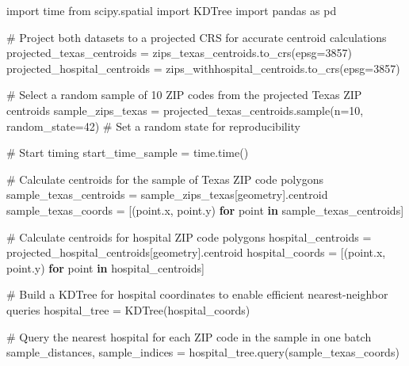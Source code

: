 \documentclass[
  letterpaper,
  DIV=11,
  numbers=noendperiod]{scrartcl}
\newenvironment{Shaded}{\begin{snugshade}}{\end{snugshade}}
\newcommand{\CommentTok}[1]{\textcolor[rgb]{0.37,0.37,0.37}{#1}}
\newcommand{\ControlFlowTok}[1]{\textcolor[rgb]{0.00,0.23,0.31}{\textbf{#1}}}
\newcommand{\DecValTok}[1]{\textcolor[rgb]{0.68,0.00,0.00}{#1}}
\newcommand{\ImportTok}[1]{\textcolor[rgb]{0.00,0.46,0.62}{#1}}
\newcommand{\KeywordTok}[1]{\textcolor[rgb]{0.00,0.23,0.31}{\textbf{#1}}}
\newcommand{\NormalTok}[1]{\textcolor[rgb]{0.00,0.23,0.31}{#1}}
\newcommand{\OperatorTok}[1]{\textcolor[rgb]{0.37,0.37,0.37}{#1}}
\newcommand{\StringTok}[1]{\textcolor[rgb]{0.13,0.47,0.30}{#1}}
\begin{document}
\begin{Shaded}
\begin{Highlighting}[]
\ImportTok{import}\NormalTok{ time}
\ImportTok{from}\NormalTok{ scipy.spatial }\ImportTok{import}\NormalTok{ KDTree}
\ImportTok{import}\NormalTok{ pandas }\ImportTok{as}\NormalTok{ pd}

\CommentTok{\# Project both datasets to a projected CRS for accurate centroid calculations}
\NormalTok{projected\_texas\_centroids }\OperatorTok{=}\NormalTok{ zips\_texas\_centroids.to\_crs(epsg}\OperatorTok{=}\DecValTok{3857}\NormalTok{)}
\NormalTok{projected\_hospital\_centroids }\OperatorTok{=}\NormalTok{ zips\_withhospital\_centroids.to\_crs(epsg}\OperatorTok{=}\DecValTok{3857}\NormalTok{)}

\CommentTok{\# Select a random sample of 10 ZIP codes from the projected Texas ZIP centroids}
\NormalTok{sample\_zips\_texas }\OperatorTok{=}\NormalTok{ projected\_texas\_centroids.sample(n}\OperatorTok{=}\DecValTok{10}\NormalTok{, random\_state}\OperatorTok{=}\DecValTok{42}\NormalTok{)  }\CommentTok{\# Set a random state for reproducibility}

\CommentTok{\# Start timing}
\NormalTok{start\_time\_sample }\OperatorTok{=}\NormalTok{ time.time()}

\CommentTok{\# Calculate centroids for the sample of Texas ZIP code polygons}
\NormalTok{sample\_texas\_centroids }\OperatorTok{=}\NormalTok{ sample\_zips\_texas[}\StringTok{\textquotesingle{}geometry\textquotesingle{}}\NormalTok{].centroid}
\NormalTok{sample\_texas\_coords }\OperatorTok{=}\NormalTok{ [(point.x, point.y) }\ControlFlowTok{for}\NormalTok{ point }\KeywordTok{in}\NormalTok{ sample\_texas\_centroids]}

\CommentTok{\# Calculate centroids for hospital ZIP code polygons}
\NormalTok{hospital\_centroids }\OperatorTok{=}\NormalTok{ projected\_hospital\_centroids[}\StringTok{\textquotesingle{}geometry\textquotesingle{}}\NormalTok{].centroid}
\NormalTok{hospital\_coords }\OperatorTok{=}\NormalTok{ [(point.x, point.y) }\ControlFlowTok{for}\NormalTok{ point }\KeywordTok{in}\NormalTok{ hospital\_centroids]}

\CommentTok{\# Build a KDTree for hospital coordinates to enable efficient nearest{-}neighbor queries}
\NormalTok{hospital\_tree }\OperatorTok{=}\NormalTok{ KDTree(hospital\_coords)}

\CommentTok{\# Query the nearest hospital for each ZIP code in the sample in one batch}
\NormalTok{sample\_distances, sample\_indices }\OperatorTok{=}\NormalTok{ hospital\_tree.query(sample\_texas\_coords)}


\end{Highlighting}
\end{Shaded}
\end{document}
